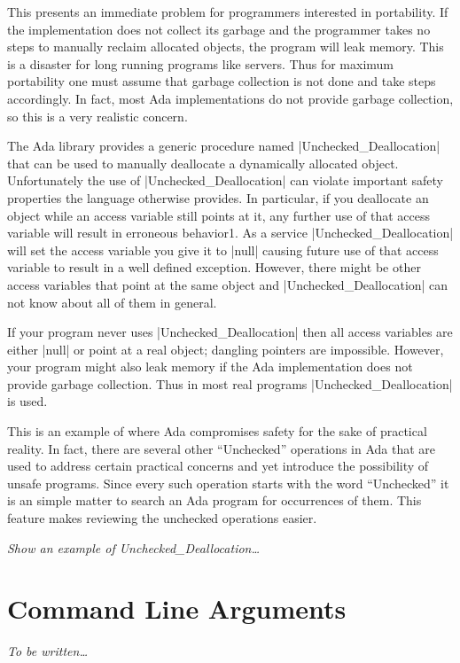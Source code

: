 This presents an immediate problem for programmers interested in portability. If the
implementation does not collect its garbage and the programmer takes no steps to manually
reclaim allocated objects, the program will leak memory. This is a disaster for long running
programs like servers. Thus for maximum portability one must assume that garbage collection is
not done and take steps accordingly. In fact, most Ada implementations do not provide garbage
collection, so this is a very realistic concern.

The Ada library provides a generic procedure named |Unchecked_Deallocation| that can be used to
manually deallocate a dynamically allocated object. Unfortunately the use of
|Unchecked_Deallocation| can violate important safety properties the language otherwise
provides. In particular, if you deallocate an object while an access variable still points at
it, any further use of that access variable will result in erroneous behavior1. As a service
|Unchecked_Deallocation| will set the access variable you give it to |null| causing future use
of that access variable to result in a well defined exception. However, there might be other
access variables that point at the same object and |Unchecked_Deallocation| can not know about
all of them in general.

If your program never uses |Unchecked_Deallocation| then all access variables are either |null|
or point at a real object; dangling pointers are impossible. However, your program might also
leak memory if the Ada implementation does not provide garbage collection. Thus in most real
programs |Unchecked_Deallocation| is used.

This is an example of where Ada compromises safety for the sake of practical reality. In fact,
there are several other ``Unchecked'' operations in Ada that are used to address certain
practical concerns and yet introduce the possibility of unsafe programs. Since every such
operation starts with the word ``Unchecked'' it is an simple matter to search an Ada program for
occurrences of them. This feature makes reviewing the unchecked operations easier.

\textit{Show an example of Unchecked\_Deallocation\ldots}

\section{Command Line Arguments}

\textit{To be written\ldots}

